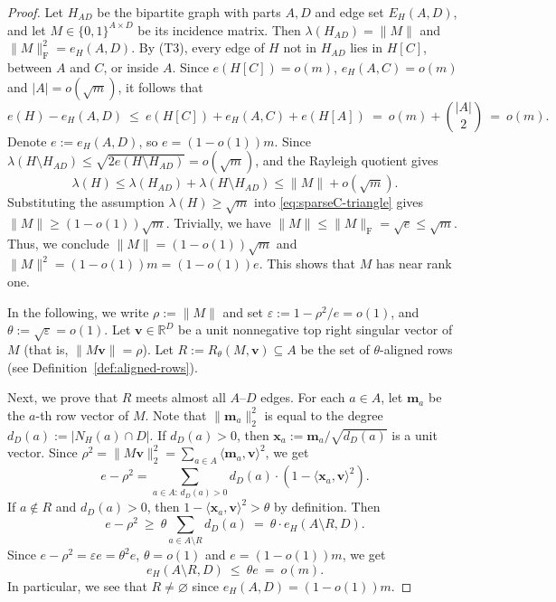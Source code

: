 \documentclass[10pt,a4paper]{amsart}
\begin{document}
\begin{proof} 
Let $H_{AD}$ be the bipartite graph with parts $A,D$ and edge set $E_H(A,D)$, and let
$M\in\{0,1\}^{A\times D}$ be its incidence matrix.
Then $\lambda(H_{AD})=\|M\|$ and $\|M\|_{\mathrm F}^2=e_H(A,D)$. 
By \textup{(T3)}, every edge of $H$ not in $H_{AD}$ lies in $H[C]$, between $A$ and $C$, or inside $A$.
Since $e(H[C])=o(m)$, $e_H(A,C)=o(m)$ and $|A| =o(\sqrt{m})$, it follows that 
\[
  e(H)-e_H(A,D)
  \ \le\
  e(H[C]) + e_H(A,C) + e(H[A])
  \ =\ o(m) + \binom{|A|}{2}
  \ =\ o(m).
\]
Denote $e:=e_H(A,D)$, so $e=(1-o(1))m$.
Since $\lambda(H\setminus H_{AD})\le \sqrt{2e(H\setminus H_{AD})}=o(\sqrt{m})$, and  the Rayleigh quotient gives 
\begin{equation}\label{eq:sparseC-triangle}
  \lambda(H) \le \lambda (H_{AD}) + \lambda (H\setminus H_{AD}) \le \|M\|+o(\sqrt{m}).
\end{equation} 
Substituting the assumption $\lambda(H)\ge \sqrt{m}$ into \eqref{eq:sparseC-triangle} gives 
$\|M\| \ge (1-o(1)) \sqrt{m}$. 
Trivially, we have $\|M\|\le \|M\|_{\mathrm F}=\sqrt e\le \sqrt{m}$. Thus, we conclude  $\|M\|=(1-o(1))\sqrt{m}$ and $ \|M\|^2 = (1-o(1)) m =(1-o(1))e$. This shows that $M$ has near rank one. 

In the following, we write $\rho:=\|M\|$ and set 
$\varepsilon:=1-\rho^2/e=o(1)$, and 
$ \theta:=\sqrt{\varepsilon} = o(1)$. 
Let $\bm{v} \in \mathbb{R}^D$ be a unit nonnegative top right singular vector of $M$ (that is, $\|M \bm{v}\| = \rho $). Let $R:=R_\theta(M, \bm{v})\subseteq A$
be the set of $\theta$-aligned rows  (see Definition~\ref{def:aligned-rows}).

Next, we prove that $R$ meets almost all $A$--$D$ edges. 
For each $a\in A$, let $\bm{m}_a$ be the $a$-th row vector of $M$. Note that $\|\bm{m}_a\|_2^2$ is equal to the degree $d_D(a):=|N_H(a)\cap D|$.
If $d_D(a)>0$, then $\bm{x}_a:=\bm{m}_a/\sqrt{d_D(a)}$ is a unit vector.
Since $\rho^2=\|M \bm{v} \|_2^2=\sum_{a\in A}\langle \bm{m}_a,\bm{v}\rangle^2$, we get 
\[
  e-\rho^2
  =
  \sum_{a\in A:\,d_D(a)>0} d_D (a) \cdot \left(1-\langle \bm{x}_a,\bm{v}\rangle^2\right).
\]
If $a\notin R$ and $d_D(a)>0$, then $1-\langle \bm{x}_a,\bm{v}\rangle^2>\theta$ by definition. Then 
\[
  e-\rho^2\ \ge\ \theta\sum_{a\in A\setminus R}d_D(a)\ =\ \theta \cdot e_H(A\setminus R,D).
\]
Since $e-\rho^2=\varepsilon e=\theta^2 e$, $\theta =o(1)$ and $e =(1-o(1))m$, 
we get
\begin{equation}\label{eq:sparseC-aligned-rowcover}
  e_H(A\setminus R,D)\ \le\ \theta e\ =\ o(m).
\end{equation}
In particular, we see that $R\neq\varnothing$ since $e_H(A,D)=(1-o(1))m$. 


\end{proof}
\end{document}
